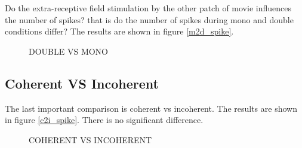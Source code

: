 Do the extra-receptive field stimulation by the other patch of movie influences the number of spikes? that is do the number of spikes during mono and double conditions differ? The results are shown in figure \ref{m2d_spike}.

\begin{figure}[!htb]
\centerline{
}
\caption{DOUBLE VS MONO} \end{figure}


\subsection{Coherent VS Incoherent}

The last important comparison is coherent vs incoherent. The results are shown in figure \ref{c2i_spike}. There is no significant difference.

\begin{figure}[!htb]
\centerline{
}
\caption{COHERENT VS INCOHERENT} \end{figure}


